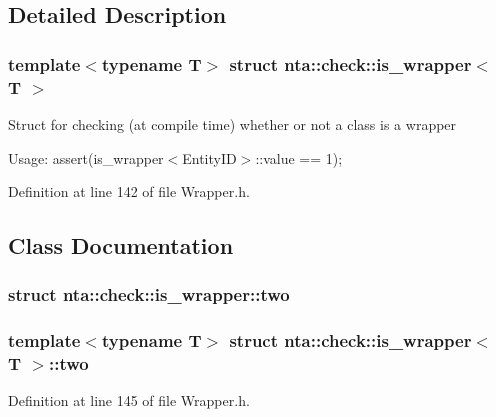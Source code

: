 \subsection{Detailed Description}
\subsubsection*{template$<$typename T$>$\newline
struct nta\+::check\+::is\+\_\+wrapper$<$ T $>$}

Struct for checking (at compile time) whether or not a class is a wrapper

Usage\+: assert(is\+\_\+wrapper$<$\+Entity\+I\+D$>$\+::value == 1); 

Definition at line 142 of file Wrapper.\+h.



\subsection{Class Documentation}
\label{structnta_1_1check_1_1is__wrapper_1_1two}
\subsubsection{struct nta\+:\+:check\+:\+:is\+\_\+wrapper\+:\+:two}
\subsubsection*{template$<$typename T$>$\newline
struct nta\+::check\+::is\+\_\+wrapper$<$ T $>$\+::two}



Definition at line 145 of file Wrapper.\+h.




